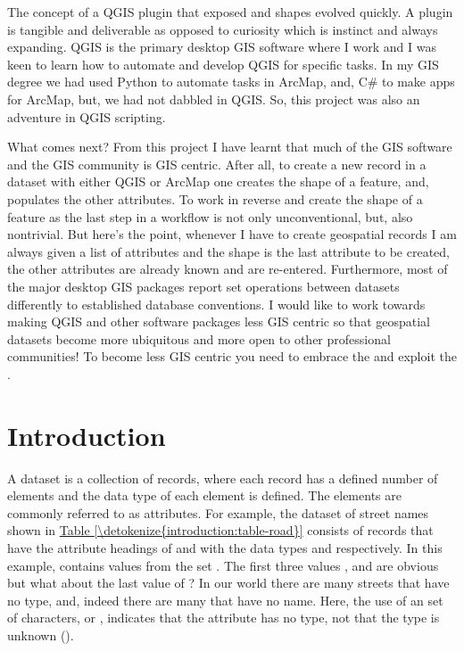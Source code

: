 \documentclass[a4paper,11pt,english]{sphinxmanual}
\begin{document}
The concept of a QGIS plugin that exposed  and  shapes evolved quickly.  A plugin is tangible and deliverable as opposed to curiosity which is instinct and always expanding.  QGIS is the primary desktop GIS software where I work and I was keen to learn how to automate and develop QGIS for specific tasks.  In my GIS degree we had used Python to automate tasks in ArcMap, and, C\# to make apps for ArcMap, but, we had not dabbled in QGIS.  So, this project was also an adventure in QGIS scripting.

What comes next?  From this project I have learnt that much of the GIS software and the GIS community is GIS centric.  After all, to create a new record in a dataset with either QGIS or ArcMap one creates the shape of a feature, and,  populates the other attributes.  To work in reverse and create the shape of a feature as the last step in a workflow is not only unconventional, but, also nontrivial.  But here’s the point, whenever I have to create geospatial records I am always given a list of attributes and the shape is the last attribute to be created, the other attributes are already known and are re-entered.  Furthermore, most of the major desktop GIS packages report set operations between datasets differently to established database conventions.  I would like to work towards making QGIS and other software packages less GIS centric so that geospatial datasets become more ubiquitous and more open to other professional communities! To become less GIS centric you need to embrace the  and exploit the .


\chapter{Introduction}
\label{\detokenize{introduction:introduction}}\label{\detokenize{introduction::doc}}
A dataset is a collection of records, where each record has a defined number of elements and the data type of each element is defined.  The elements are commonly referred to as attributes.  For example, the dataset of street names shown in \hyperref[\detokenize{introduction:table-road}]{Table \ref{\detokenize{introduction:table-road}}} consists of records that have the attribute headings of  and  with the data types  and  respectively.  In this example,  contains values from the set .  The first three values ,  and  are obvious \textendash{} but what about the last value of ?     In our world there are many streets that have no type, and, indeed there are many that have no name.  Here, the use of an  set of characters, or , indicates that the  attribute has no type, not that the type is unknown ().
\end{document}
